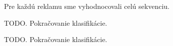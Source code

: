 Pre každú reklamu sme vyhodnocovali celú sekvenciu.


\newpage

TODO. Pokračovanie klasifikácie.

\newpage

TODO. Pokračovanie klasifikácie.


